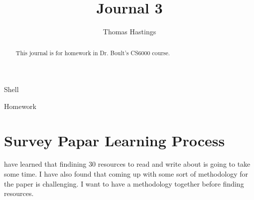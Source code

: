 \documentclass[journal]{IEEEtran}
\begin{document}
  \title{Journal 3}
  \author{Thomas Hastings}%
  
  {Shell}
  \maketitle
  
  \begin{abstract}
  This journal is for homework in Dr. Boult's CS6000 course.
  \end{abstract}
  
  \begin{IEEEkeywords}
  Homework
  \end{IEEEkeywords}
  
  
  \section{Survey Papar Learning Process}
   have learned that findining 30 resources to read and write about is going to take some time. I have also found that coming up with some sort of methodology for the paper is challenging. I want to have a methodology together before finding resources. 
  
  
  
  
\end{document}
